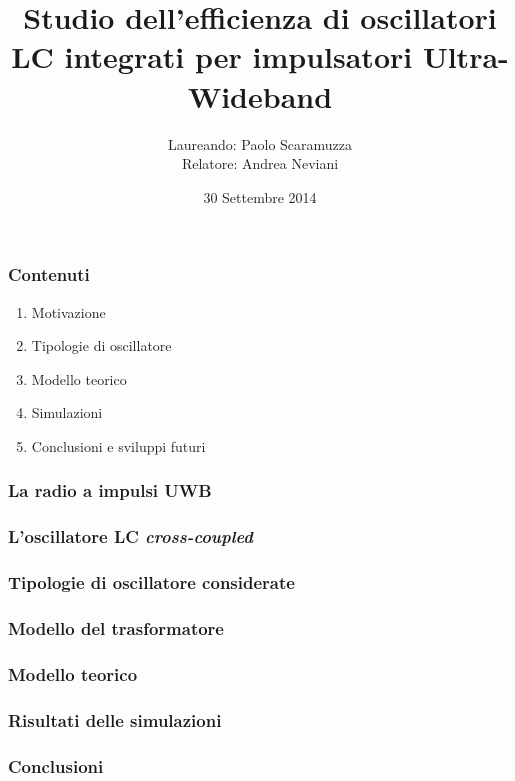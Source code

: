 \documentclass{beamer}
\title{Studio dell'efficienza di oscillatori LC integrati per impulsatori
	Ultra-Wideband}
\author{Laureando: Paolo Scaramuzza \\ Relatore: Andrea Neviani}
\date{30 Settembre 2014}
\begin{document}
%
\begin{frame}
\maketitle
\end{frame}
%
\begin{frame}
\frametitle{Contenuti}
\begin{enumerate}
	\item Motivazione
	\vfill %
	\item Tipologie di oscillatore
	\vfill
	\item Modello teorico
	\vfill
	\item Simulazioni
	\vfill
	\item Conclusioni e sviluppi futuri
	\vfill
\end{enumerate}
\end{frame}
%
\begin{frame}
\frametitle{La radio a impulsi UWB}

\end{frame}
%
\begin{frame}
\frametitle{L'oscillatore LC \emph{cross-coupled}}

\end{frame}
%
\begin{frame}
\frametitle{Tipologie di oscillatore considerate}

\end{frame}
%
\begin{frame}
\frametitle{Modello del trasformatore}

\end{frame}
%
\begin{frame}
\frametitle{Modello teorico}

\end{frame}
%
\begin{frame}
\frametitle{Risultati delle simulazioni}

\end{frame}
%
\begin{frame}
\frametitle{Conclusioni}

\end{frame}
\end{document}
